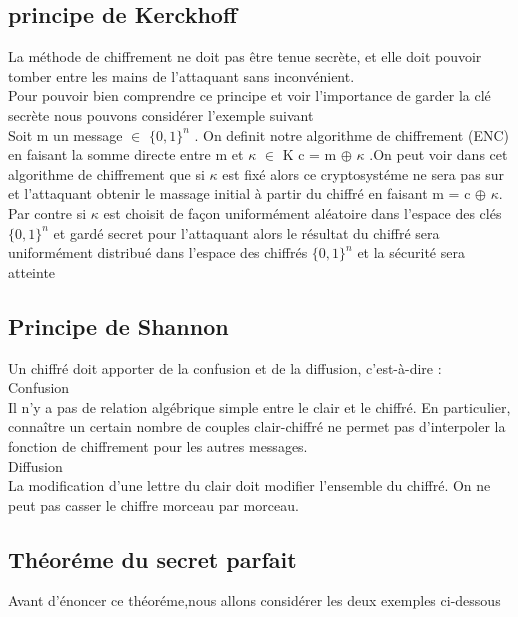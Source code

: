 \subsection{principe de Kerckhoff}
La méthode de chiffrement ne doit pas être tenue secrète, et elle doit pouvoir tomber entre les mains de l'attaquant sans inconvénient.
\\
Pour pouvoir bien comprendre ce principe et voir l’importance de garder la clé secrète nous pouvons considérer l’exemple suivant
\\
Soit m un message $\in$  $\{ 0,1 \}^n$ . On definit notre algorithme de chiffrement (ENC) en faisant la somme directe entre m et $\kappa$ $\in$ K
c = m  $\oplus$ $\kappa$ .On peut voir dans cet algorithme de chiffrement que si $\kappa$ est fixé
alors  ce cryptosystéme ne sera pas sur  et l'attaquant obtenir le massage initial à partir du chiffré en faisant m = c  $\oplus$ $\kappa$.
\\
Par contre si $\kappa$ est choisit de façon uniformément aléatoire   dans l’espace des clés $\{ 0,1 \}^n$ et gardé secret   pour l’attaquant alors le résultat du chiffré sera uniformément distribué dans l’espace des chiffrés $\{ 0,1 \}^n$  et la sécurité  sera atteinte
\subsection{Principe de Shannon}
Un chiffré doit apporter de la confusion et de la diffusion, c’est-à-dire :\\

Confusion \\
Il n’y a pas de relation algébrique simple entre le clair et le chiffré. En particulier, connaître un certain nombre de couples clair-chiffré ne permet pas d’interpoler la fonction de chiffrement pour les autres messages.\\
Diffusion\\
La modification d’une lettre du clair doit modifier l’ensemble du chiffré. On ne peut pas casser le chiffre morceau par morceau.
\subsection{Théoréme du secret parfait }
Avant d’énoncer ce théoréme,nous allons considérer les deux exemples ci-dessous \\
